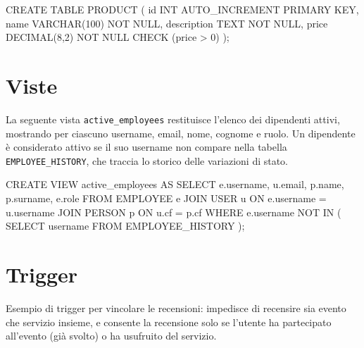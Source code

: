 \documentclass[a4paper,12pt]{report}
\begin{document}
\begin{sqlcode}[caption={},label={lst:check}]
CREATE TABLE PRODUCT (
    id INT AUTO_INCREMENT PRIMARY KEY,
    name VARCHAR(100) NOT NULL,
    description TEXT NOT NULL,
    price DECIMAL(8,2) NOT NULL CHECK (price > 0)
);
\end{sqlcode}

\section{Viste}
La seguente vista \texttt{active\_employees} restituisce l'elenco dei
dipendenti attivi,
mostrando per ciascuno username, email, nome, cognome e ruolo. Un
dipendente è considerato
attivo se il suo username non compare nella tabella
\texttt{EMPLOYEE\_HISTORY}, che traccia
lo storico delle variazioni di stato.

\begin{sqlcode}[caption={},label={lst:view}]
CREATE VIEW active_employees AS
SELECT
    e.username,
    u.email,
    p.name,
    p.surname,
    e.role
FROM EMPLOYEE e
JOIN USER u ON e.username = u.username
JOIN PERSON p ON u.cf = p.cf
WHERE e.username NOT IN (
    SELECT username FROM EMPLOYEE_HISTORY
  );
\end{sqlcode}

\section{Trigger}
Esempio di trigger per vincolare le recensioni: impedisce di
recensire sia evento che servizio
insieme, e consente la recensione solo se l'utente ha partecipato
all'evento (già svolto) o ha
usufruito del servizio.
\end{document}
